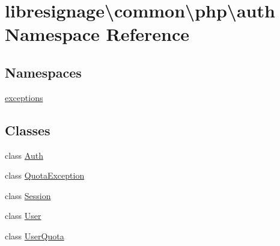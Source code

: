 \hypertarget{namespacelibresignage_1_1common_1_1php_1_1auth}{}\section{libresignage\textbackslash{}common\textbackslash{}php\textbackslash{}auth Namespace Reference}
\label{namespacelibresignage_1_1common_1_1php_1_1auth}
\subsection*{Namespaces}
\begin{DoxyCompactItemize}
\item 
 \hyperlink{namespacelibresignage_1_1common_1_1php_1_1auth_1_1exceptions}{exceptions}
\end{DoxyCompactItemize}
\subsection*{Classes}
\begin{DoxyCompactItemize}
\item 
class \hyperlink{classlibresignage_1_1common_1_1php_1_1auth_1_1Auth}{Auth}
\item 
class \hyperlink{classlibresignage_1_1common_1_1php_1_1auth_1_1QuotaException}{Quota\+Exception}
\item 
class \hyperlink{classlibresignage_1_1common_1_1php_1_1auth_1_1Session}{Session}
\item 
class \hyperlink{classlibresignage_1_1common_1_1php_1_1auth_1_1User}{User}
\item 
class \hyperlink{classlibresignage_1_1common_1_1php_1_1auth_1_1UserQuota}{User\+Quota}
\end{DoxyCompactItemize}
